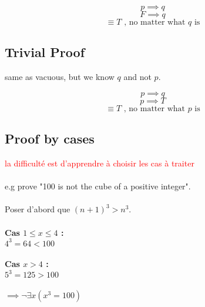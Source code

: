 \documentclass{article}
\begin{document}
\[ p \implies q \]
\[ F \implies q \]
\[ \equiv T \text{ , no matter what } q \text{ is} \]

\subsection{Trivial Proof}

same as vacuous, but we know $ q $ and not $ p $.

\[ p \implies q \]
\[ p \implies T \]
\[ \equiv T \text{ , no matter what } p \text{ is} \]

\subsection{Proof by cases}

\textcolor{red}{la difficulté est d'apprendre à choisir les cas à traiter} \\ \\
e.g prove "100 is not the cube of a positive integer". \\ \\
Poser d'abord que $ (n+1)^3 > n^3 $. \\ \\
\textbf{Cas $ 1 \leq x \leq 4 $ :} \\
$ 4^3 = 64 < 100 $ \\ \\
\textbf{Cas $ x > 4 $ :} \\
$ 5^3 = 125 > 100 $ \\ \\
$ \implies \neg{\exists{x}} (x^3 = 100) $
\end{document}
